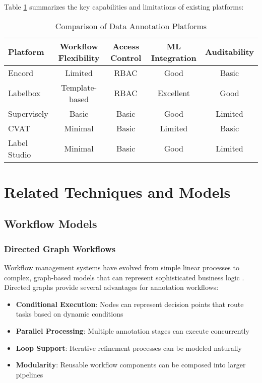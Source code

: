 Table \ref{tab:platform-comparison} summarizes the key capabilities and limitations of existing platforms:

\begin{table}[htbp]
\centering
\caption{Comparison of Data Annotation Platforms}
\label{tab:platform-comparison}
\begin{tabular}{|l|c|c|c|c|}
\hline
\textbf{Platform} & \textbf{Workflow Flexibility} & \textbf{Access Control} & \textbf{ML Integration} & \textbf{Auditability} \\
\hline
Encord & Limited & RBAC & Good & Basic \\
Labelbox & Template-based & RBAC & Excellent & Good \\
Supervisely & Basic & Basic & Good & Limited \\
CVAT & Minimal & Basic & Limited & Basic \\
Label Studio & Minimal & Basic & Good & Limited \\
\hline
\end{tabular}
\end{table}

\section{Related Techniques and Models}
\label{sec:related-techniques}

\subsection{Workflow Models}
\label{subsec:workflow-models}

\subsubsection{Directed Graph Workflows}

Workflow management systems have evolved from simple linear processes to complex, graph-based models that can represent sophisticated business logic \cite{aalst2003workflow}. Directed graphs provide several advantages for annotation workflows:

\begin{itemize}
    \item \textbf{Conditional Execution}: Nodes can represent decision points that route tasks based on dynamic conditions
    \item \textbf{Parallel Processing}: Multiple annotation stages can execute concurrently
    \item \textbf{Loop Support}: Iterative refinement processes can be modeled naturally
    \item \textbf{Modularity}: Reusable workflow components can be composed into larger pipelines
\end{itemize}

